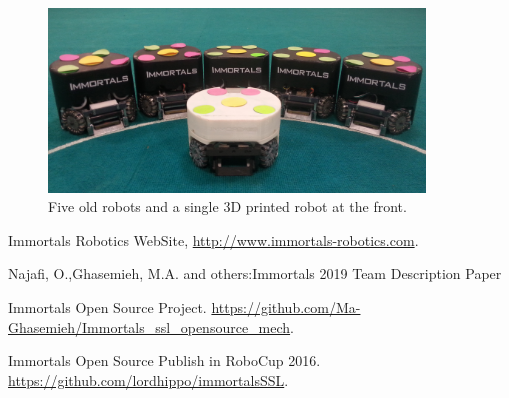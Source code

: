 \documentclass[runningheads]{llncs}
\begin{document}
\begin{figure}
\centering
\includegraphics[width=10cm]{images/5plus1.jpg}
\caption{Five old robots and a single 3D printed robot at the front.} \label{fig_5plus1}
\end{figure}



\newpage
\begin{thebibliography}{8}
Immortals Robotics WebSite, \url{http://www.immortals-robotics.com}.

Najafi, O.,Ghasemieh, M.A. and others:Immortals 2019 Team Description Paper

Immortals Open Source Project. \url{https://github.com/Ma-Ghasemieh/Immortals\_ssl\_opensource\_mech}.

Immortals Open Source Publish in RoboCup 2016. \url{https://github.com/lordhippo/immortalsSSL}.

\end{thebibliography}
\end{document}
